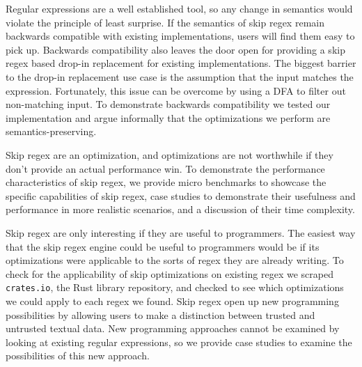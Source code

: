 Regular expressions are a well established tool, so any change in
semantics would violate the principle of least surprise.
If the semantics of skip regex remain backwards compatible with
existing implementations, users will find them easy to pick up.
Backwards compatibility also leaves the door open for providing
a skip regex based drop-in replacement for existing implementations.
The biggest barrier to the drop-in replacement use case is the
assumption that the input matches the expression. Fortunately,
this issue can be overcome by using a DFA to filter out non-matching
input. To demonstrate backwards compatibility we tested our implementation
and argue informally that the optimizations we perform are
semantics-preserving.

Skip regex are an optimization,
and optimizations are not worthwhile if they don't provide an
actual performance win. To demonstrate the performance characteristics
of skip regex, we provide micro benchmarks to showcase the specific
capabilities of skip regex, case studies to demonstrate their
usefulness and performance in more realistic scenarios, and a
discussion of their time complexity.

Skip regex are only interesting if they are useful to programmers.
The easiest way that the skip regex engine could be useful to programmers
would be if its optimizations were applicable to the sorts of regex they
are already writing. To check for the applicability of skip optimizations
on existing regex we scraped \verb'crates.io',
the Rust library repository, and checked to see which optimizations
we could apply to each regex we found. Skip regex open up new programming
possibilities by allowing users to make a distinction between trusted
and untrusted textual data. New programming approaches cannot be 
examined by looking at existing regular expressions, so we provide
case studies to examine the possibilities of this new approach.


